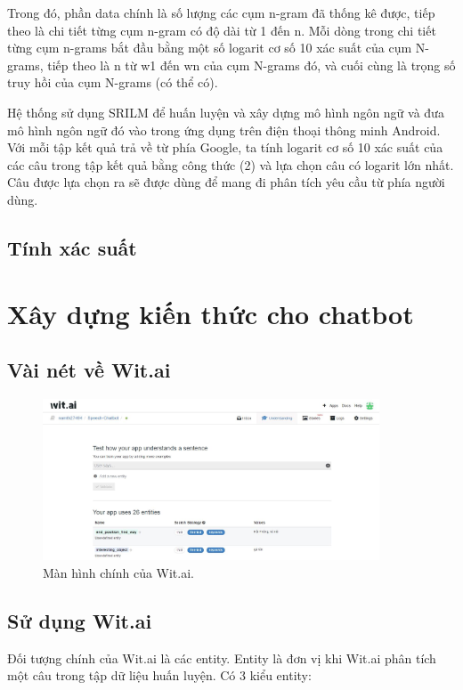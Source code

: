\documentclass[12pt]{report}
\begin{document}
Trong đó, phần data chính là số lượng các cụm n-gram đã thống kê được, tiếp theo là chi tiết từng cụm n-gram có độ dài từ 1 đến n. Mỗi dòng trong chi tiết từng cụm n-grams bắt đầu bằng một số logarit cơ số 10 xác suất của cụm N-grams, tiếp theo là n từ w1 đến wn của cụm N-grams đó, và cuối cùng là trọng số truy hồi của cụm N-grams (có thể có).

Hệ thống sử dụng SRILM để huấn luyện và xây dựng mô hình ngôn ngữ và đưa mô hình ngôn ngữ đó vào trong ứng dụng trên điện thoại thông minh Android. Với mỗi tập kết quả trả về từ phía Google, ta tính logarit cơ số 10 xác suất của các câu trong tập kết quả bằng công thức (2) và lựa chọn câu có logarit lớn nhất. Câu được lựa chọn ra sẽ được dùng để mang đi phân tích yêu cầu từ phía người dùng.

\subsection{Tính xác suất}



\section{Xây dựng kiến thức cho chatbot}

\subsection{Vài nét về Wit.ai}

\begin{figure}[H] \label{fig:mainboard-wit}
	\centering
	\includegraphics[width=10cm]{Pics/Chap6/wit-mainboard.JPG}
	\caption{Màn hình chính của Wit.ai.}
\end{figure}

\subsection{Sử dụng Wit.ai}

Đối tượng chính của Wit.ai là các entity. Entity là đơn vị khi Wit.ai phân tích một câu trong tập dữ liệu huấn luyện. Có 3 kiểu entity:
\end{document}
